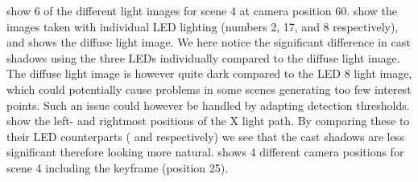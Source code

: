 \documentclass[thesis.tex]{subfiles}
\begin{document}
 show 6 of the different light images for scene 4 at camera position 60.  show the images taken with individual LED lighting (numbers 2, 17, and 8 respectively), and  shows the diffuse light image. We here notice the significant difference in cast shadows using the three LEDs individually compared to the diffuse light image. The diffuse light image is however quite dark compared to the LED 8 light image, which could potentially cause problems in some scenes generating too few interest points. Such an issue could however be handled by adapting detection thresholds.
 show the left- and rightmost positions of the X light path. By comparing these to their LED counterparts ( and  respectively) we see that the cast shadows are less significant therefore looking more natural.
 shows 4 different camera positions for scene 4 including the keyframe (position 25).
%
\end{document}
